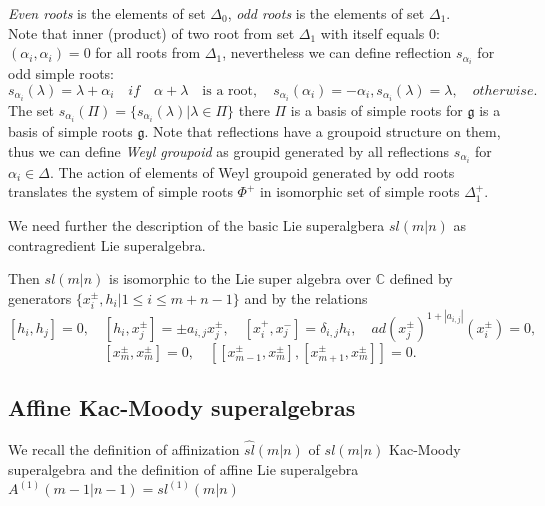 \documentclass[english]{elsarticle}
\numberwithin{equation}{section}
\begin{document}
{\it Even roots} is the elements of set $\Delta_0$, {\it odd roots} is the elements of set $\Delta_1$.\\

Note that inner (product) of two root from set $\Delta_1$ with itself equals $0$: $(\alpha_i,\alpha_i)=0$ for all roots from $\Delta_1$, nevertheless we can define reflection $s_{\alpha_i}$ for odd simple roots:
\begin{equation}
\label{rel:5}
    s_{\alpha_i}(\lambda)= \lambda + \alpha_i \quad if \quad \alpha+\lambda\quad  \text{is a root}, \quad
    s_{\alpha_i}(\alpha_i)=-\alpha_i,
    s_{\alpha_i}(\lambda)=\lambda, \quad otherwise.
\end{equation}
The set $s_{\alpha_i}(\Pi)=\{s_{\alpha_i}(\lambda)|\lambda \in \Pi\}$ there $\Pi$ is a basis of simple roots for $\mathfrak{g}$ is a basis of simple roots $\mathfrak{g}$.
Note that reflections have a groupoid structure on them, thus we can define {\it Weyl groupoid} as groupid generated by all reflections $s_{\alpha_i}$ for $\alpha_i \in \Delta$. The action of elements of Weyl groupoid generated by odd roots translates the system of simple roots $\Phi^+$ in isomorphic set of simple roots $\Delta^{+}_1$.

We need further the description of  the  basic Lie superalgbera $sl(m|n)$ as contragredient Lie superalgebra.

Then $sl(m|n)$ is isomorphic to the Lie super algebra  over $\mathbb{C}$ defined by generators $\{x_{i}^{\pm}, h_{i} | 1\leq i \leq m+n-1 \}$ and by the relations
\begin{equation}
\label{in:6}
[h_{i},h_{j}]=0,\quad    [h_i,x_{j}^{\pm}]=\pm a_{i,j}x_{j}^{\pm},\quad
[x_i^{+},x_j^{-}]=\delta_{i,j}h_i,\quad ad(x_{j}^{\pm})^{1+|a_{i,j}|}(x_{i}^{\pm}) = 0, \quad
\end{equation}
\begin{equation}
\label{in:7}
[x_{m}^{\pm},x_{m}^{\pm}]=0, \quad [[x_{m-1}^{\pm},x_{m}^{\pm}],[x_{m+1}^{\pm},x_{m}^{\pm}]]=0.
\end{equation}



\subsection{Affine Kac-Moody superalgebras}

We recall the definition of affinization $\hat{sl}(m|n)$ of $sl(m|n)$ Kac-Moody superalgebra and the definition of affine Lie superalgebra
$A^{(1)}(m-1|n-1)=sl^{(1)}(m|n)$
\end{document}
